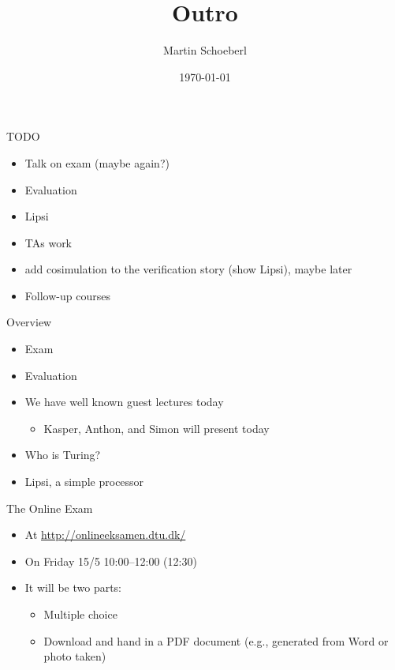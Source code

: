 

\newif\ifbook


\title{Outro}
\author{Martin Schoeberl}
\date{\today}



\begin{frame}
\titlepage
\end{frame}


\begin{frame}[fragile]{TODO}
\begin{itemize}
\item Talk on exam (maybe again?)
\item Evaluation
\item Lipsi
\item TAs work
\item add cosimulation to the verification story (show Lipsi), maybe later
\item Follow-up courses
\end{itemize}
\end{frame}

\begin{frame}[fragile]{Overview}
\begin{itemize}
\item Exam
\item Evaluation
\item We have well known guest lectures today
\begin{itemize}
\item Kasper, Anthon, and Simon will present today
\end{itemize}
\item Who is Turing?
\item Lipsi, a simple processor
\end{itemize}
\end{frame}


\begin{frame}[fragile]{The Online Exam}
\begin{itemize}
\item At \url{http://onlineeksamen.dtu.dk/}
\item On Friday 15/5 10:00--12:00 (12:30)
\item It will be two parts:
\begin{itemize}
\item Multiple choice
\item Download and hand in a PDF document (e.g., generated from Word or photo taken)
\end{itemize}
\end{itemize}
\end{frame}


